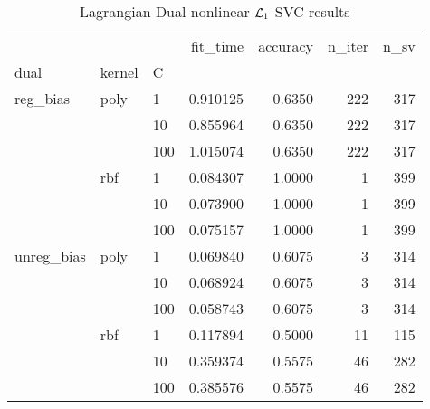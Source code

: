 \begin{table}[H]
\centering
\caption{Lagrangian Dual nonlinear $\protect \mathcal{L}_1$-SVC results}
\label{nonlinear_lagrangian_dual_l1_svc_cv_results}
\begin{tabular}{lllrrrr}
\toprule
           &     &     &  fit\_time &  accuracy &  n\_iter &  n\_sv \\
dual & kernel & C &           &           &         &       \\
\midrule
reg\_bias & poly & 1   &  0.910125 &    0.6350 &     222 &   317 \\
           &     & 10  &  0.855964 &    0.6350 &     222 &   317 \\
           &     & 100 &  1.015074 &    0.6350 &     222 &   317 \\
           & rbf & 1   &  0.084307 &    1.0000 &       1 &   399 \\
           &     & 10  &  0.073900 &    1.0000 &       1 &   399 \\
           &     & 100 &  0.075157 &    1.0000 &       1 &   399 \\
unreg\_bias & poly & 1   &  0.069840 &    0.6075 &       3 &   314 \\
           &     & 10  &  0.068924 &    0.6075 &       3 &   314 \\
           &     & 100 &  0.058743 &    0.6075 &       3 &   314 \\
           & rbf & 1   &  0.117894 &    0.5000 &      11 &   115 \\
           &     & 10  &  0.359374 &    0.5575 &      46 &   282 \\
           &     & 100 &  0.385576 &    0.5575 &      46 &   282 \\
\bottomrule
\end{tabular}
\end{table}
